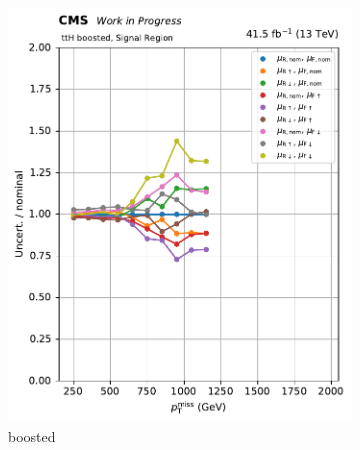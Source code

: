 \begin{figure}[htbp]
    \centering
    \begin{subfigure}[b]{0.34\textwidth}
        \includegraphics[width=\textwidth]{figures/qcd_scale_top_procs/ttbar/ratio_vars_SR_ttH_boosted.pdf}
        \caption{\ttH boosted}
    \end{subfigure}
    \hspace{0.05\textwidth}
    \begin{subfigure}[b]{0.34\textwidth}

\end{subfigure}
\end{figure}
